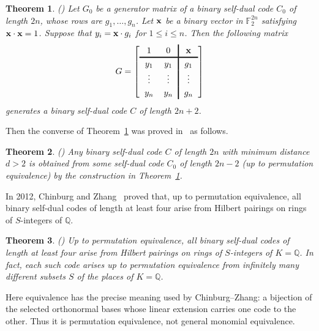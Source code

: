 \documentclass[12pt]{article}
\newtheorem{theorem}{Theorem}[section]
\begin{document}
\begin{theorem}(\cite[Theorem 1]{Kim2001}) \label{thm-binary-build-1}
Let $G_0$ be a generator matrix of a binary self-dual code $C_0$ of length $2n$, whose rows are $g_1, \dots, g_n$. Let $\bf x$ be a binary vector in $\mathbb F_2^{2n}$ satisfying ${\bf x} \cdot {\bf x} = 1$. Suppose that $y_i ={\bf x} \cdot g_i$ for $1 \le i \le n$. Then the following matrix
\[
\begingroup
\setlength{\arraycolsep}{6pt}
\renewcommand{\arraystretch}{1.2}
G=
\left[
\begin{array}{cc!{\vrule width 1.2pt}c}
1 & 0 & \mathbf{x}\\
\noalign{\hrule height 1.2pt}
y_1 & y_1 & g_1\\
\vdots & \vdots & \vdots\\
y_n & y_n & g_n
\end{array}
\right]
\endgroup
\]
generates a binary self-dual code $C$ of length $2n+2$.
\end{theorem}

Then the converse of Theorem~\ref{thm-binary-build-1} was proved in~\cite{Kim2001} as follows.

\begin{theorem} (\cite[Theorem 2]{Kim2001})  \label{thm-binary-build-2}
 Any binary self-dual code $C$ of length $2n$ with minimum distance $d>2$ is obtained from some self-dual code $C_0$ of length
$2n-2$ (up to permutation equivalence) by the construction in
Theorem~\ref{thm-binary-build-1}.
\end{theorem}

In 2012, Chinburg and Zhang~\cite{ChinburgZhang} proved that, up to
permutation equivalence, all binary self-dual codes of length at least four
arise from Hilbert pairings on rings of $S$-integers of $\mathbb Q$.

\begin{theorem}(\cite[Theorem 1.5]{ChinburgZhang})  \label{thm-binary-hilbert-2}
Up to permutation equivalence, all binary self-dual codes of length at least
four arise from Hilbert pairings on rings of $S$-integers of
$K=\mathbb Q$. In fact, each such code arises up to permutation equivalence
from infinitely many different subsets $S$ of the places of $K=\mathbb Q$.
\end{theorem}

Here equivalence has the precise meaning used by Chinburg--Zhang: a
bijection of the selected orthonormal bases whose linear extension carries
one code to the other. Thus it is permutation equivalence, not general
monomial equivalence.
\end{document}

